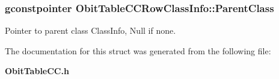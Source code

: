 \subsubsection{\setlength{\rightskip}{0pt plus 5cm}gconstpointer {\bf Obit\-Table\-CCRow\-Class\-Info::Parent\-Class}}\label{structObitTableCCRowClassInfo_o3}


Pointer to parent class Class\-Info, Null if none. 



The documentation for this struct was generated from the following file:\begin{CompactItemize}
\item 
{\bf Obit\-Table\-CC.h}\end{CompactItemize}
